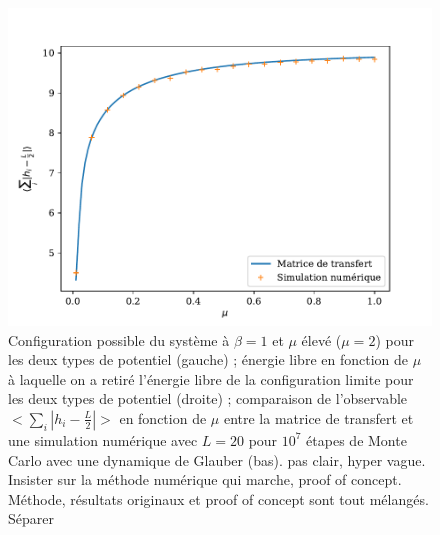 \begin{figure}
\begin{minipage}{0.4\linewidth}
    	\includegraphics[width=\linewidth]{chap4/simu-tm-negstagged-l20.pdf}
	\end{minipage}
	\caption{Configuration possible du système à $\beta=1$ et $\mu$ élevé ($\mu=2$) pour les deux types de potentiel (gauche) ; énergie libre en fonction de $\mu$ à laquelle on a retiré l'énergie libre de la configuration limite pour les deux types de potentiel (droite) ; comparaison de l'observable $<\sum_i |h_i-\frac{L}{2}|>$ en fonction de $\mu$ entre la matrice de transfert et une simulation numérique avec $L=20$ pour $10^7$ étapes de Monte Carlo avec une dynamique de Glauber (bas). 
	{\color{red} pas clair, hyper vague. Insister sur la méthode numérique qui marche, proof of concept. Méthode, résultats originaux et proof of concept sont tout mélangés. Séparer}}
    \label{comp-potentiels-chimiques}
\end{figure}  

